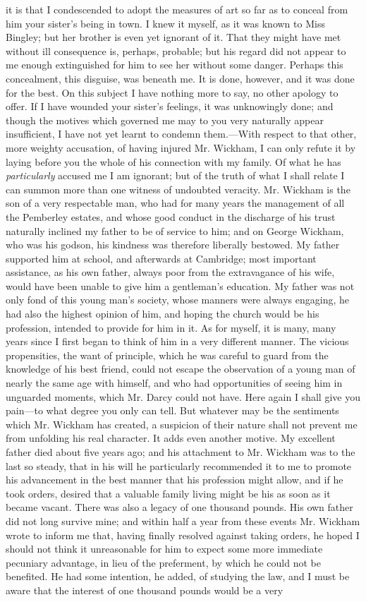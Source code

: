 \documentclass[12pt]{book}
\begin{document}
it is that I condescended to adopt the measures of art so far as to conceal from him your sister's being in town. I knew it myself, as it was known to Miss Bingley; but her brother is even yet ignorant of it. That they might have met without ill consequence is, perhaps, probable; but his regard did not appear to me enough extinguished for him to see her without some danger. Perhaps this concealment, this disguise, was beneath me. It is done, however, and it was done for the best. On this subject I have nothing more to say, no other apology to offer. If I have wounded your sister's feelings, it was unknowingly done; and though the motives which governed me may to you very naturally appear insufficient, I have not yet learnt to condemn them.---With respect to that other, more weighty accusation, of having injured Mr. Wickham, I can only refute it by laying before you the whole of his connection with my family. Of what he has \textit{particularly} accused me I am ignorant; but of the truth of what I shall relate I can summon more than one witness of undoubted veracity. Mr. Wickham is the son of a very respectable man, who had for many years the management of all the Pemberley estates, and whose good conduct in the discharge of his trust naturally inclined my father to be of service to him; and on George Wickham, who was his godson, his kindness was therefore liberally bestowed. My father supported him at school, and afterwards at Cambridge; most important assistance, as his own father, always poor from the extravagance of his wife, would have been unable to give him a gentleman's education. My father was not only fond of this young man's society, whose manners were always engaging, he had also the highest opinion of him, and hoping the church would be his profession, intended to provide for him in it. As for myself, it is many, many years since I first began to think of him in a very different manner. The vicious propensities, the want of principle, which he was careful to guard from the knowledge of his best friend, could not escape the observation of a young man of nearly the same age with himself, and who had opportunities of seeing him in unguarded moments, which Mr. Darcy could not have. Here again I shall give you pain---to what degree you only can tell. But whatever may be the sentiments which Mr. Wickham has created, a suspicion of their nature shall not prevent me from unfolding his real character. It adds even another motive. My excellent father died about five years ago; and his attachment to Mr. Wickham was to the last so steady, that in his will he particularly recommended it to me to promote his advancement in the best manner that his profession might allow, and if he took orders, desired that a valuable family living might be his as soon as it became vacant. There was also a legacy of one thousand pounds. His own father did not long survive mine; and within half a year from these events Mr. Wickham wrote to inform me that, having finally resolved against taking orders, he hoped I should not think it unreasonable for him to expect some more immediate pecuniary advantage, in lieu of the preferment, by which he could not be benefited. He had some intention, he added, of studying the law, and I must be aware that the interest of one thousand pounds would be a very 
\end{document}
